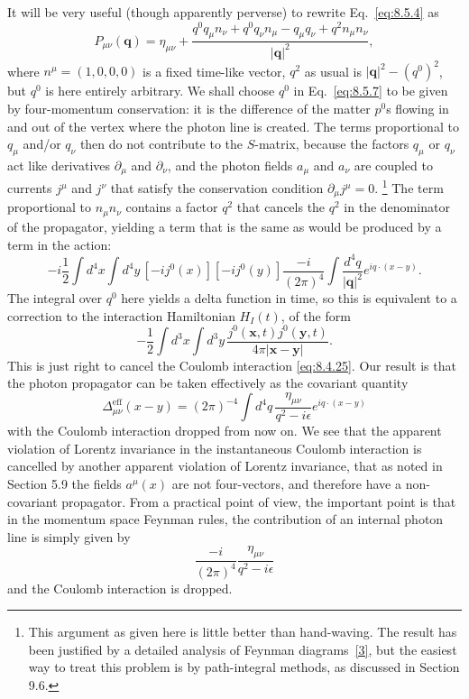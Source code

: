 It will be very useful (though apparently perverse) to rewrite Eq.~\eqref{eq:8.5.4} as
\begin{equation}
P_{\mu\nu}(\mathbf q)=\eta_{\mu\nu}
+\frac{q^0q_\mu n_\nu+q^0q_\nu n_\mu-q_\mu q_\nu+q^2n_\mu n_\nu}
       {\lvert\mathbf q\rvert^2},
\tag{8.5.7}\label{eq:8.5.7}
\end{equation}
where $n^\mu=(1,0,0,0)$ is a fixed time-like vector, $q^2$ as usual is
$\lvert\mathbf q\rvert^2-(q^0)^2$, but $q^0$ is here entirely
arbitrary. We shall choose $q^0$ in Eq.~\eqref{eq:8.5.7} to be given by
four-momentum conservation: it is the difference of the matter $p^0$s flowing
in and out of the vertex where the photon line is created. The terms
proportional to $q_\mu$ and/or $q_\nu$ then do not contribute to the $S$-matrix,
because the factors $q_\mu$ or $q_\nu$ act like derivatives $\partial_\mu$ and
$\partial_\nu$, and the photon fields $a_\mu$ and $a_\nu$ are coupled to
currents $j^\mu$ and $j^\nu$ that satisfy the conservation condition
$\partial_\mu j^\mu=0$.
\footnote{This argument as given here is little better than hand-waving. The
result has been justified by a detailed analysis of Feynman diagrams~\hyperref[ref:8.3]{[3]}, but
the easiest way to treat this problem is by path-integral methods, as discussed
in Section 9.6.}
The term proportional to $n_\mu n_\nu$ contains a factor $q^2$ that cancels the
$q^2$ in the denominator of the propagator, yielding a term that is the same
as would be produced by a term in the action:
\[
-i\frac12\int d^4x\int d^4y\,
[-ij^0(x)][-ij^0(y)]\frac{-i}{(2\pi)^4}
\int\frac{d^4q}{\lvert\mathbf q\rvert^2}e^{iq\cdot(x-y)}.
\]
The integral over $q^0$ here yields a delta function in time, so this is
equivalent to a correction to the interaction Hamiltonian $H_I(t)$, of the
form
\[
-\frac12\int d^3x\int d^3y\,
\frac{j^0(\mathbf x,t)j^0(\mathbf y,t)}
     {4\pi\lvert\mathbf x-\mathbf y\rvert}.
\]
This is just right to cancel the Coulomb interaction \eqref{eq:8.4.25}. Our result is
that the photon propagator can be taken effectively as the covariant quantity
\begin{equation}
\Delta^{\mathrm{eff}}_{\mu\nu}(x-y)
=(2\pi)^{-4}\int d^4q\,
\frac{\eta_{\mu\nu}}{q^2-i\epsilon}e^{iq\cdot(x-y)}
\tag{8.5.8}\label{eq:8.5.8}
\end{equation}
with the Coulomb interaction dropped from now on. We see that the apparent
violation of Lorentz invariance in the instantaneous Coulomb interaction is
cancelled by another apparent violation of Lorentz invariance, that as noted
in Section 5.9 the fields $a^\mu(x)$ are not four-vectors, and therefore have
a non-covariant propagator. From a practical point of view, the important
point is that in the momentum space Feynman rules, the contribution of an
internal photon line is simply given by
\begin{equation}
\frac{-i}{(2\pi)^4}\frac{\eta_{\mu\nu}}{q^2-i\epsilon}
\tag{8.5.9}\label{eq:8.5.9}
\end{equation}
and the Coulomb interaction is dropped.
